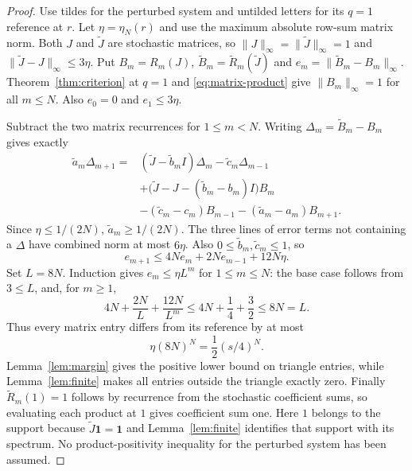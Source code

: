 \documentclass[11pt]{article}
\begin{document}
\begin{proof}
Use tildes for the perturbed system and untilded letters for its $q=1$ reference at $r$. Let $\eta=\eta_N(r)$ and use the maximum absolute row-sum matrix norm. Both $J$ and $\widetilde J$ are stochastic matrices, so $\|J\|_\infty=\|\widetilde J\|_\infty=1$ and $\|\widetilde J-J\|_\infty\leq3\eta$. Put $B_m=R_m(J)$, $\widetilde B_m=\widetilde R_m(\widetilde J)$ and $e_m=\|\widetilde B_m-B_m\|_\infty$. Theorem~\ref{thm:criterion} at $q=1$ and \eqref{eq:matrix-product} give $\|B_m\|_\infty=1$ for all $m\leq N$. Also $e_0=0$ and $e_1\leq3\eta$.

Subtract the two matrix recurrences for $1\leq m<N$. Writing $\Delta_m=\widetilde B_m-B_m$ gives exactly
\begin{align*}
\widetilde a_m\Delta_{m+1}
={}&(\widetilde J-\widetilde b_m I)\Delta_m-\widetilde c_m\Delta_{m-1}\\
 &+\big(\widetilde J-J-(\widetilde b_m-b_m)I\big)B_m\\
 &-(\widetilde c_m-c_m)B_{m-1}-(\widetilde a_m-a_m)B_{m+1}.
\end{align*}
Since $\eta\leq1/(2N)$, $\widetilde a_m\geq1/(2N)$. The three lines of error terms not containing a $\Delta$ have combined norm at most $6\eta$. Also $0\leq\widetilde b_m,\widetilde c_m\leq1$, so
\begin{equation}\label{eq:error-recursion}
e_{m+1}\leq4Ne_m+2Ne_{m-1}+12N\eta.
\end{equation}
Set $L=8N$. Induction gives $e_m\leq\eta L^m$ for $1\leq m\leq N$: the base case follows from $3\leq L$, and, for $m\geq1$,
\[
4N+\frac{2N}{L}+\frac{12N}{L^m}
\leq4N+\frac14+\frac32\leq8N=L.
\]
Thus every matrix entry differs from its reference by at most
\[
\eta(8N)^N=\frac12(s/4)^N.
\]
Lemma~\ref{lem:margin} gives the positive lower bound on triangle entries, while Lemma~\ref{lem:finite} makes all entries outside the triangle exactly zero. Finally $\widetilde R_m(1)=1$ follows by recurrence from the stochastic coefficient sums, so evaluating each product at $1$ gives coefficient sum one. Here $1$ belongs to the support because $\widetilde J\boldsymbol1=\boldsymbol1$ and Lemma~\ref{lem:finite} identifies that support with its spectrum. No product-positivity inequality for the perturbed system has been assumed.
\end{proof}
\end{document}
